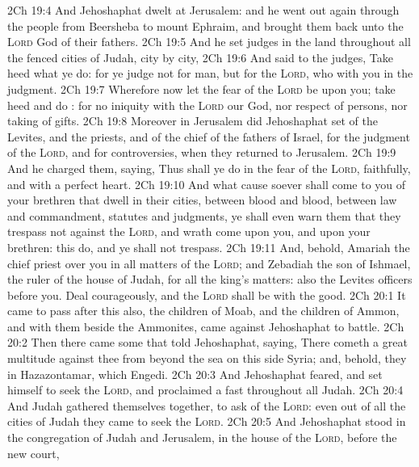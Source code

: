 \vs 2Ch 19:4 And Jehoshaphat dwelt at Jerusalem: and he went out again through the people from Beersheba to mount Ephraim, and brought them back unto the \textsc{Lord} God of their fathers.
\vs 2Ch 19:5 And he set judges in the land throughout all the fenced cities of Judah, city by city,
\vs 2Ch 19:6 And said to the judges, Take heed what ye do: for ye judge not for man, but for the \textsc{Lord}, who  with you in the judgment.
\vs 2Ch 19:7 Wherefore now let the fear of the \textsc{Lord} be upon you; take heed and do : for  no iniquity with the \textsc{Lord} our God, nor respect of persons, nor taking of gifts.
\vs 2Ch 19:8 Moreover in Jerusalem did Jehoshaphat set of the Levites, and  the priests, and of the chief of the fathers of Israel, for the judgment of the \textsc{Lord}, and for controversies, when they returned to Jerusalem.
\vs 2Ch 19:9 And he charged them, saying, Thus shall ye do in the fear of the \textsc{Lord}, faithfully, and with a perfect heart.
\vs 2Ch 19:10 And what cause soever shall come to you of your brethren that dwell in their cities, between blood and blood, between law and commandment, statutes and judgments, ye shall even warn them that they trespass not against the \textsc{Lord}, and  wrath come upon you, and upon your brethren: this do, and ye shall not trespass.
\vs 2Ch 19:11 And, behold, Amariah the chief priest  over you in all matters of the \textsc{Lord}; and Zebadiah the son of Ishmael, the ruler of the house of Judah, for all the king's matters: also the Levites  officers before you. Deal courageously, and the \textsc{Lord} shall be with the good.
\vs 2Ch 20:1 It came to pass after this also,  the children of Moab, and the children of Ammon, and with them  beside the Ammonites, came against Jehoshaphat to battle.
\vs 2Ch 20:2 Then there came some that told Jehoshaphat, saying, There cometh a great multitude against thee from beyond the sea on this side Syria; and, behold, they  in Hazazontamar, which  Engedi.
\vs 2Ch 20:3 And Jehoshaphat feared, and set himself to seek the \textsc{Lord}, and proclaimed a fast throughout all Judah.
\vs 2Ch 20:4 And Judah gathered themselves together, to ask  of the \textsc{Lord}: even out of all the cities of Judah they came to seek the \textsc{Lord}.
\vs 2Ch 20:5 And Jehoshaphat stood in the congregation of Judah and Jerusalem, in the house of the \textsc{Lord}, before the new court,
